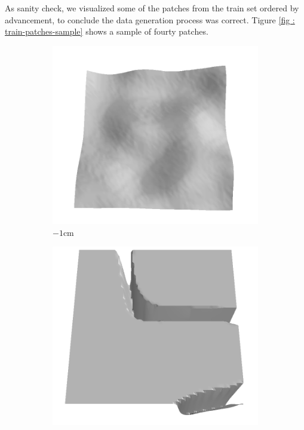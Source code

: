 \documentclass[../document.tex]{subfiles}
\begin{document}
As sanity check, we visualized some of the patches from the train set ordered by advancement, to conclude the data generation process was correct. Tigure \ref{fig : train-patches-sample} shows a sample of fourty patches.
\begin{figure}[htbp] 
    \centering
    \begin{subfigure}[b]{0.19\textwidth}
    \includegraphics[width=\linewidth]{../img/5/train/all/-1-patch-3d-majavi-3.png}
    \caption{$-1$cm}
    \end{subfigure}
    \begin{subfigure}[b]{0.19\textwidth}
    \includegraphics[width=\linewidth]{../img/5/train/all/-3-patch-3d-majavi-2.png}

\end{subfigure}
\end{figure}
\end{document}

